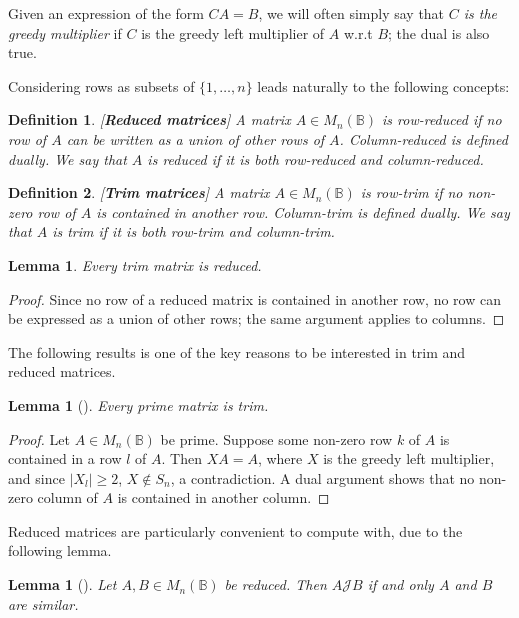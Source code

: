 \documentclass[11pt]{article}
\newtheorem{lemma}[thm]{Lemma}
\newtheorem*{defi}{Definition}
\newenvironment{de}{\begin{defi}\rm}{\end{defi}}
\numberwithin{equation}{section}
\newcommand{\B}{\mathbb{B}}
\newcommand{\Bn}{M_n(\B)}
\newcommand{\J}{\mathscr{J}}
\begin{document}
Given an expression of the form $CA = B$, we will often simply say that
\emph{$C$ is the greedy multiplier} if $C$ is the greedy left multiplier
of $A$ w.r.t $B$; the dual is also true.

Considering rows as subsets of $\{1, \ldots, n\}$ leads naturally to the
following concepts:

\begin{de}[\textbf{Reduced matrices}]
  A matrix $A \in \Bn$ is \emph{row-reduced} if no row of $A$ can be written as
  a union of other rows of $A$. \emph{Column-reduced} is defined dually. We say
  that $A$ is \emph{reduced} if it is both row-reduced and column-reduced.
\end{de}

\begin{de}[\textbf{Trim matrices}]
  A matrix $A \in \Bn$ is \emph{row-trim} if no non-zero row of $A$ is contained in
  another row. \emph{Column-trim} is defined dually. We say that $A$ is
  \emph{trim} if it is both row-trim and column-trim.
\end{de}

\begin{lemma}
  Every trim matrix is reduced.
\end{lemma}
\begin{proof}
  Since no row of a reduced matrix is contained in another row, no row can be
  expressed as a union of other rows; the same argument applies to columns.
\end{proof}

The following results is one of the key reasons to be interested in trim and
reduced matrices.

\begin{lemma}[\cite{Konieczny2011aa}]
  Every prime matrix is trim.
\end{lemma}
\begin{proof}
  Let $A \in \Bn$ be prime. Suppose some non-zero row $k$ of $A$ is contained in
  a row $l$ of $A$. Then $XA = A$, where $X$ is the greedy left multiplier, and
  since $|X_l| \geq 2$, $X \not\in S_n$, a contradiction. A dual argument shows
  that no non-zero column of $A$ is contained in another column.
\end{proof}

Reduced matrices are particularly convenient to compute with, due to the
following lemma. 
\begin{lemma}[\cite{Plemmons1970aa}]
  Let $A, B \in \Bn$ be reduced. Then $A \J B$ if and only $A$ and $B$ are
  similar.
\end{lemma}
\end{document}
